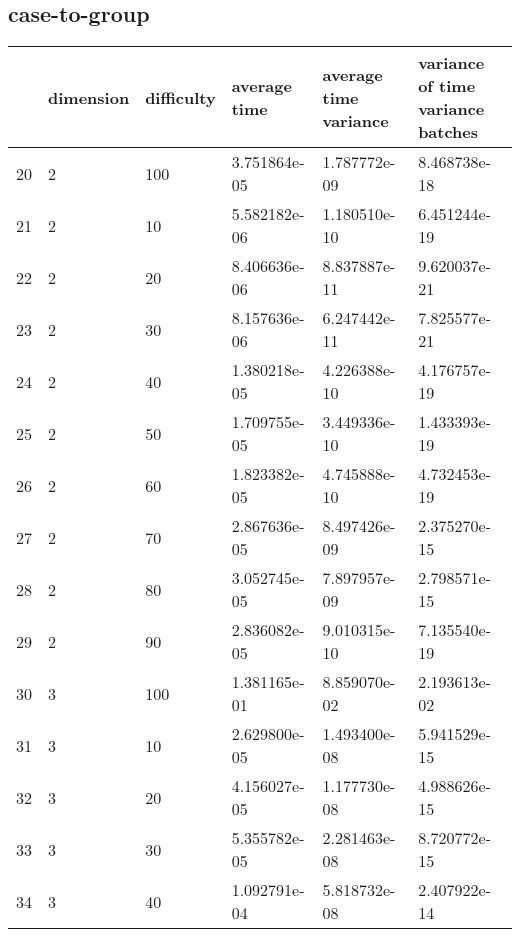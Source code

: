 \documentclass{article}
\begin{document}
\subsection{case-to-group}
\begin{center}
\begin{tabular}{llllll}
\toprule
{} & dimension & difficulty &  average time & average time variance & variance of time variance batches \\
\midrule
20 &         2 &        100 &  3.751864e-05 &          1.787772e-09 &                      8.468738e-18 \\
21 &         2 &         10 &  5.582182e-06 &          1.180510e-10 &                      6.451244e-19 \\
22 &         2 &         20 &  8.406636e-06 &          8.837887e-11 &                      9.620037e-21 \\
23 &         2 &         30 &  8.157636e-06 &          6.247442e-11 &                      7.825577e-21 \\
24 &         2 &         40 &  1.380218e-05 &          4.226388e-10 &                      4.176757e-19 \\
25 &         2 &         50 &  1.709755e-05 &          3.449336e-10 &                      1.433393e-19 \\
26 &         2 &         60 &  1.823382e-05 &          4.745888e-10 &                      4.732453e-19 \\
27 &         2 &         70 &  2.867636e-05 &          8.497426e-09 &                      2.375270e-15 \\
28 &         2 &         80 &  3.052745e-05 &          7.897957e-09 &                      2.798571e-15 \\
29 &         2 &         90 &  2.836082e-05 &          9.010315e-10 &                      7.135540e-19 \\
30 &         3 &        100 &  1.381165e-01 &          8.859070e-02 &                      2.193613e-02 \\
31 &         3 &         10 &  2.629800e-05 &          1.493400e-08 &                      5.941529e-15 \\
32 &         3 &         20 &  4.156027e-05 &          1.177730e-08 &                      4.988626e-15 \\
33 &         3 &         30 &  5.355782e-05 &          2.281463e-08 &                      8.720772e-15 \\
34 &         3 &         40 &  1.092791e-04 &          5.818732e-08 &                      2.407922e-14 \\

\end{tabular}
\end{center}
\end{document}
